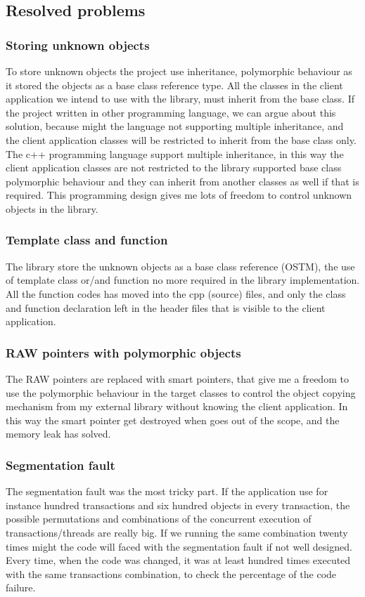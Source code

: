 \documentclass[12pt]{article}
\begin{document}
\subsection{Resolved problems }

\subsubsection{Storing unknown objects }
To store unknown objects the project use inheritance, polymorphic behaviour as it stored the objects as a base class reference type. All the classes in the client application we intend to use with the library, must inherit from the base class. If the project written in other programming language, we can argue about this solution, because might the language not supporting multiple inheritance, and the client application classes will be restricted to inherit from the base class only.\\

The c++ programming language support multiple inheritance, in this way the client application classes are not restricted to the library supported base class polymorphic behaviour and they can inherit from another classes as well if that is required. This programming design gives me lots of freedom to control unknown objects in the library.

\subsubsection{Template class and function }
The library store the unknown objects as a base class reference (OSTM), the use of template class or/and function no more required in the library implementation. All the function codes has moved into the cpp (source) files, and only the class and function declaration left in the header files that is visible to the client application.

\subsubsection{RAW pointers with polymorphic objects}
The RAW pointers are replaced with smart pointers, that give me a freedom to use the polymorphic behaviour in the target classes to control the object copying mechanism from my external library without knowing the client application. In this way the smart pointer get destroyed when goes out of the scope, and the memory leak has solved.

\subsubsection{Segmentation fault}
The segmentation fault was the most tricky part. If the application use for instance hundred transactions and six hundred objects in every transaction, the possible permutations and combinations of the concurrent execution of transactions/threads are really big. If we running the same combination twenty times might the code will faced with the segmentation fault if not well designed. Every time, when the code was changed, it was at least hundred times executed with the same transactions combination, to check the percentage of the code failure.\\
\end{document}
